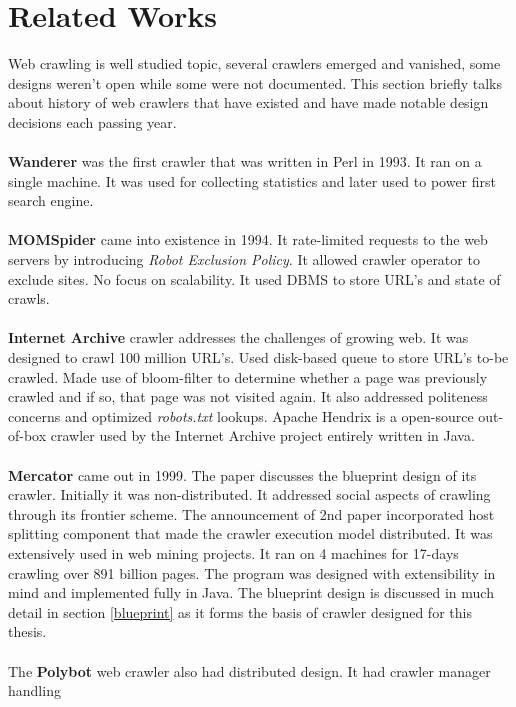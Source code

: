\section{Related Works}\label{relatedworks}
Web crawling is well studied topic, several crawlers emerged and vanished, some designs weren't open while
some were not documented. This section briefly talks about history of web crawlers that have existed and have made notable design decisions each passing year.
\\
\\
\textbf{Wanderer} was the first crawler that was written in Perl in 1993. It ran on a single machine. It was used for collecting statistics and later used to power first search engine. 
\\
\\
\textbf{MOMSpider} came into existence in 1994. It rate-limited requests to the web servers by introducing
\textit{Robot Exclusion Policy}. It allowed crawler operator to exclude sites. No focus on scalability. It
used DBMS to store URL's and state of crawls.
\\
\\
\textbf{Internet Archive} \cite{netarchive} crawler addresses the challenges of growing web. It was designed to crawl 100 million URL's. Used disk-based queue to store URL's to-be crawled. Made use of bloom-filter to determine whether a page was previously crawled and if so, that page was not visited again. It also addressed politeness concerns and optimized \textit{robots.txt} lookups. Apache Hendrix is a open-source out-of-box
crawler used by the Internet Archive project entirely written in Java.
\\
\\
\textbf{Mercator} \cite{mercator} came out in 1999. The paper discusses the blueprint design of its crawler. Initially it was non-distributed. It addressed social aspects of crawling through its frontier scheme. The announcement of 2nd paper incorporated host splitting component that made the crawler execution model distributed. It was extensively used in web mining projects. It ran on 4 machines for 17-days crawling over 891 billion pages. The program was designed with extensibility in mind and implemented fully in Java.
The blueprint design is discussed in much detail in section \ref{blueprint} as it forms the basis of
crawler designed for this thesis.
\\
\\
The \textbf{Polybot}\cite{polybot} web crawler also had distributed design. It had crawler manager handling
